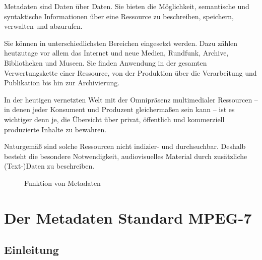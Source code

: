 	Metadaten sind Daten über Daten. Sie bieten die Möglichkeit, semantische und syntaktische Informationen über eine Ressource zu beschreiben, speichern, verwalten und abzurufen.
	
	Sie können in unterschiedlichsten Bereichen eingesetzt werden. Dazu zählen heutzutage vor allem das Internet und neue Medien, Rundfunk, Archive, Bibliotheken und Museen. Sie finden Anwendung in der gesamten Verwertungskette einer Ressource, von der Produktion über die Verarbeitung und Publikation bis hin zur Archivierung.

	In der heutigen vernetzten Welt mit der Omnipräsenz multimedialer Ressourcen -- in denen jeder Konsument und Produzent gleichermaßen sein kann -- ist es wichtiger denn je, die Übersicht über privat, öffentlich und kommerziell produzierte Inhalte zu bewahren.
	
	Naturgemäß sind solche Ressourcen nicht indizier- und durchsuchbar. Deshalb besteht die besondere Notwendigkeit, audiovisuelles Material durch zusätzliche (Text-)Daten zu beschreiben.

	\begin{figure}[htbp]
		\caption{Funktion von Metadaten}
		\label{myfigure}
	\end{figure}
	
	
	\section {Der Metadaten Standard MPEG-7} 
	
	\subsection {Einleitung}
	

